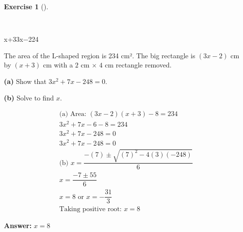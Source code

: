\documentclass[
  letterpaper,
  DIV=11,
  numbers=noendperiod]{scrreprt}
\theoremstyle{definition}
\newtheorem{exercise}{Exercise}[chapter]
\theoremstyle{remark}
\begin{document}
\begin{exercise}[]\protect\hypertarget{exr-u6-30-1}{}\label{exr-u6-30-1}

~

x+33x−224

The area of the L-shaped region is 234 cm². The big rectangle is
\((3x-2)\) cm by \((x+3)\) cm with a \(2\) cm \(\times\) \(4\) cm
rectangle removed.

\textbf{(a)} Show that \(3x^2 + 7x - 248 = 0\).

\textbf{(b)} Solve to find \(x\).

\begin{tcolorbox}[enhanced jigsaw, opacitybacktitle=0.6, coltitle=black, arc=.35mm, colframe=quarto-callout-tip-color-frame, colback=white, bottomrule=.15mm, left=2mm, colbacktitle=quarto-callout-tip-color!10!white, titlerule=0mm, opacityback=0, title=\textcolor{quarto-callout-tip-color}{\faLightbulb}\hspace{0.5em}{🔍 View Solution}, leftrule=.75mm, breakable, rightrule=.15mm, bottomtitle=1mm, toptitle=1mm, toprule=.15mm]

\begin{align*}
\text{(a) Area: } (3x-2)(x+3) - 8 = 234 \\ 3x^2 +7x - 6 - 8 = 234 \\ 3x^2 +7x - 248 = 0 \\ 3x^2 + 7x - 248 = 0 \\ \text{(b) } x = \dfrac{-(7) \pm \sqrt{(7)^2 - 4(3)(-248)}}{6} \\ x = \dfrac{-7 \pm 55}{6} \\ x = 8 \text{ or } x = -\dfrac{31}{3} \\ \text{Taking positive root: } x = 8
\end{align*}

\textbf{Answer:} \(x = 8\)

\end{tcolorbox}

\end{exercise}
\end{document}
